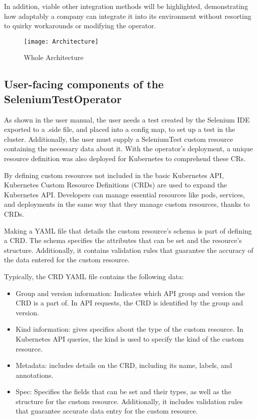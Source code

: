 In addition, viable other integration methods will be highlighted, demonstrating how adaptably a company can integrate it into its environment without resorting to quirky workarounds or modifying the operator.

\begin{figure}[H]
	\centering
	\texttt{[image: Architecture]}
	\label{fig:architecture}
	\caption{Whole Architecture}
\end{figure}

\subsection{User-facing components of the SeleniumTestOperator}
As shown in the user manual, the user needs a test created by the Selenium IDE exported to a .side file, and placed into a config map, to set up a test in the cluster. Additionally, the user must supply a SeleniumTest custom resource containing the necessary data about it. With the operator's deployment, a unique resource definition was also deployed for Kubernetes to comprehend these CRs.

By defining custom resources not included in the basic Kubernetes API, Kubernetes Custom Resource Definitions (CRDs) are used to expand the Kubernetes API. Developers can manage essential resources like pods, services, and deployments in the same way that they manage custom resources, thanks to CRDs.

Making a YAML file that details the custom resource's schema is part of defining a CRD. The schema specifies the attributes that can be set and the resource's structure. Additionally, it contains validation rules that guarantee the accuracy of the data entered for the custom resource.

Typically, the CRD YAML file contains the following data:

\begin{itemize}
	\item Group and version information: Indicates which API group and version the CRD is a part of. In API requests, the CRD is identified by the group and version.
	\item Kind information: gives specifics about the type of the custom resource. In Kubernetes API queries, the kind is used to specify the kind of the custom resource.
	\item Metadata: includes details on the CRD, including its name, labels, and annotations.
	\item Spec: Specifies the fields that can be set and their types, as well as the structure for the custom resource. Additionally, it includes validation rules that guarantee accurate data entry for the custom resource.
\end{itemize}

